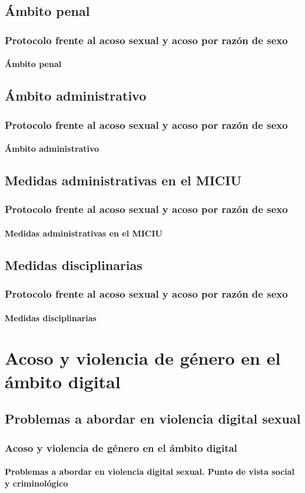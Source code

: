 \documentclass{beamer}
\begin{document}
    \subsection{Ámbito penal}
    \begin{frame}
		\frametitle{Protocolo frente al acoso sexual y acoso por razón de sexo}
        \framesubtitle{Ámbito penal}
	\end{frame}

    \subsection{Ámbito administrativo}
    \begin{frame}
		\frametitle{Protocolo frente al acoso sexual y acoso por razón de sexo}
        \framesubtitle{Ámbito administrativo}
	\end{frame}

    \subsection{Medidas administrativas en el MICIU}
    \begin{frame}
		\frametitle{Protocolo frente al acoso sexual y acoso por razón de sexo}
        \framesubtitle{Medidas administrativas en el MICIU}
	\end{frame}

    \subsection{Medidas disciplinarias}
    \begin{frame}
		\frametitle{Protocolo frente al acoso sexual y acoso por razón de sexo}
        \framesubtitle{Medidas disciplinarias}
	\end{frame}

    \section{Acoso y violencia de género en el ámbito digital}

    \subsection{Problemas a abordar en violencia digital sexual}
    \begin{frame}
		\frametitle{Acoso y violencia de género en el ámbito digital}
        \framesubtitle{Problemas a abordar en violencia digital sexual. Punto de vista social y criminológico}
	\end{frame}
\end{document}
